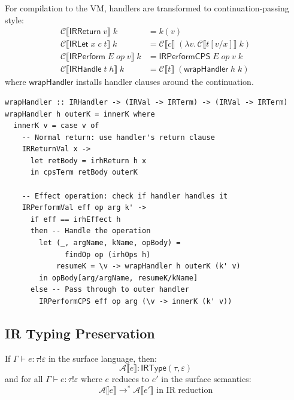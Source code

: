 \begin{definition}
\label{def:cps-transform}
For compilation to the VM, handlers are transformed to continuation-passing style:
\begin{align}
\mathcal{C}\llbracket \mathsf{IRReturn}\; v \rrbracket\; k &= k(v) \\
\mathcal{C}\llbracket \mathsf{IRLet}\; x\; c\; t \rrbracket\; k &= \mathcal{C}\llbracket c \rrbracket\; (\lambda v.\, \mathcal{C}\llbracket t[v/x] \rrbracket\; k) \\
\mathcal{C}\llbracket \mathsf{IRPerform}\; E\; \mathit{op}\; v \rrbracket\; k &= \mathsf{IRPerformCPS}\; E\; \mathit{op}\; v\; k \\
\mathcal{C}\llbracket \mathsf{IRHandle}\; t\; h \rrbracket\; k &= \mathcal{C}\llbracket t \rrbracket\; (\mathsf{wrapHandler}\; h\; k)
\end{align}
where $\mathsf{wrapHandler}$ installs handler clauses around the continuation.
\end{definition}

\begin{definition}
\label{def:cps-handler-install}
\begin{verbatim}
wrapHandler :: IRHandler -> (IRVal -> IRTerm) -> (IRVal -> IRTerm)
wrapHandler h outerK = innerK where
  innerK v = case v of
    -- Normal return: use handler's return clause
    IRReturnVal x ->
      let retBody = irhReturn h x
      in cpsTerm retBody outerK

    -- Effect operation: check if handler handles it
    IRPerformVal eff op arg k' ->
      if eff == irhEffect h
      then -- Handle the operation
        let (_, argName, kName, opBody) =
              findOp op (irhOps h)
            resumeK = \v -> wrapHandler h outerK (k' v)
        in opBody[arg/argName, resumeK/kName]
      else -- Pass through to outer handler
        IRPerformCPS eff op arg (\v -> innerK (k' v))
\end{verbatim}
\end{definition}

\subsection{IR Typing Preservation}
\label{subsec:ir-typing}

\begin{theorem}
\label{thm:ir-typing-preservation}
If $\Gamma \vdash e : \tau \mathbin{!} \varepsilon$ in the surface language, then:
\[
\mathcal{A}\llbracket e \rrbracket : \mathsf{IRType}(\tau, \varepsilon)
\]
and for all $\Gamma \vdash e : \tau \mathbin{!} \varepsilon$ where $e$ reduces to $e'$ in the surface semantics:
\[
\mathcal{A}\llbracket e \rrbracket \to^* \mathcal{A}\llbracket e' \rrbracket \text{ in IR reduction}
\]
\end{theorem}

